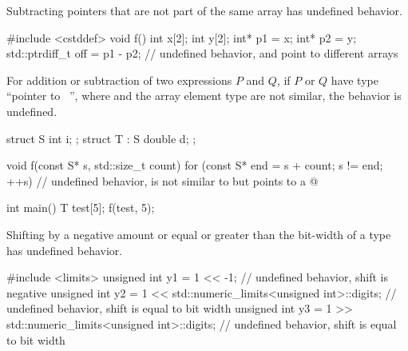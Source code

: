 
\pnum
Subtracting pointers that are not part of the same array
has undefined behavior.

\pnum
\begin{example}
\begin{codeblock}
#include <cstddef>
void f() {
  int x[2];
  int y[2];
  int* p1 = x;
  int* p2 = y;
  std::ptrdiff_t off = p1 - p2; // undefined behavior,  and  point to different arrays
}
\end{codeblock}
\end{example}

\pnum
For addition or subtraction of two expressions $P$ and $Q$,
if $P$ or $Q$ have type ``pointer to \cv{}~'', where  and the array
element type are not similar, the behavior is undefined.

\pnum
\begin{example}
\begin{codeblock}
struct S     {  int i;    };
struct T : S {  double d; };

void f(const S* s, std::size_t count) {
  for (const S* end = s + count; s != end; ++s) {
        // undefined behavior,  is not similar to  but  points to a 
    @\commentellip@
  }
}

int main() {
  T test[5];
  f(test, 5);
}
\end{codeblock}
\end{example}


\pnum
Shifting by a negative amount or equal or greater than
the bit-width of a type has undefined behavior.

\pnum
\begin{example}
\begin{codeblock}
#include <limits>
unsigned int y1 = 1 << -1;  // undefined behavior, shift is negative
unsigned int y2 = 1 << std::numeric_limits<unsigned int>::digits;
                            // undefined behavior, shift is equal to bit width
unsigned int y3 = 1 >> std::numeric_limits<unsigned int>::digits;
                            // undefined behavior, shift is equal to bit width
\end{codeblock}
\end{example}


